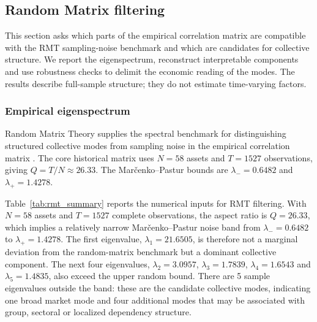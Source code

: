 \subsection{Random Matrix filtering}
\label{sec:rmt}

This section asks which parts of the empirical correlation matrix are compatible with the RMT sampling-noise benchmark and which are candidates for collective structure. We report the eigenspectrum, reconstruct interpretable components and use robustness checks to delimit the economic reading of the modes. The results describe full-sample structure; they do not estimate time-varying factors.

\subsubsection{Empirical eigenspectrum}

Random Matrix Theory supplies the spectral benchmark for distinguishing structured collective modes from sampling noise in the empirical correlation matrix \cite{laloux_1999_noise,plerou_2002_random}. The core historical matrix uses $N=58$ assets and $T=1527$ observations, giving $Q=T/N\approx26.33$. The Mar\v{c}enko--Pastur bounds are $\lambda_-=0.6482$ and $\lambda_+=1.4278$.

\begin{center}
\label{tab:rmt_summary}
\end{center}

Table~\ref{tab:rmt_summary} reports the numerical inputs for RMT filtering. With $N=58$ assets and $T=1527$ complete observations, the aspect ratio is $Q=26.33$, which implies a relatively narrow Mar\v{c}enko--Pastur noise band from $\lambda_-=0.6482$ to $\lambda_+=1.4278$. The first eigenvalue, $\lambda_1=21.6505$, is therefore not a marginal deviation from the random-matrix benchmark but a dominant collective component. The next four eigenvalues, $\lambda_2=3.0957$, $\lambda_3=1.7839$, $\lambda_4=1.6543$ and $\lambda_5=1.4835$, also exceed the upper random bound. There are 5 sample eigenvalues outside the band: these are the candidate collective modes, indicating one broad market mode and four additional modes that may be associated with group, sectoral or localized dependency structure.

